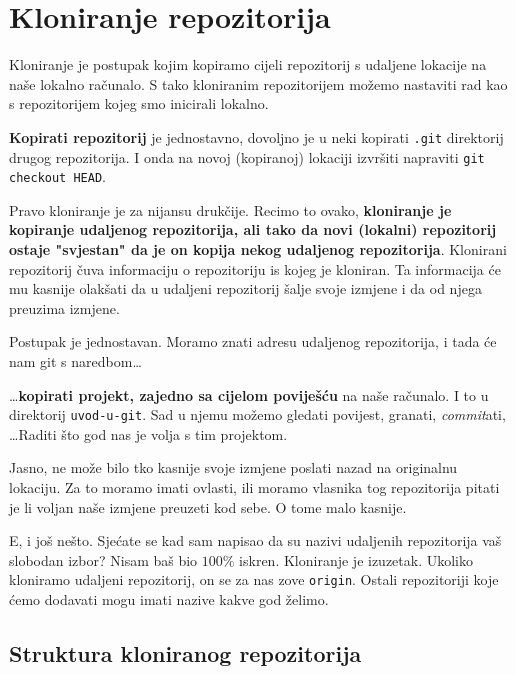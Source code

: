 \section*{Kloniranje repozitorija}

Kloniranje je postupak kojim kopiramo cijeli repozitorij s udaljene lokacije na naše lokalno računalo.
S tako kloniranim repozitorijem možemo nastaviti rad kao s repozitorijem kojeg smo inicirali lokalno.

\textbf{Kopirati repozitorij} je jednostavno, dovoljno je u neki kopirati \verb+.git+ direktorij drugog repozitorija.
I onda na novoj (kopiranoj) lokaciji izvršiti napraviti \verb+git checkout HEAD+.

Pravo kloniranje je za nijansu drukčije.
Recimo to ovako, \textbf{kloniranje je kopiranje udaljenog repozitorija, ali tako da novi (lokalni) repozitorij ostaje "svjestan" da je on kopija nekog udaljenog repozitorija}.
Klonirani repozitorij čuva informaciju o repozitoriju is kojeg je kloniran.
Ta informacija će mu kasnije olakšati da u udaljeni repozitorij šalje svoje izmjene i da od njega preuzima izmjene.

Postupak je jednostavan. Moramo znati adresu udaljenog repozitorija, i tada će nam git s naredbom\dots



\dots{}\textbf{kopirati projekt, zajedno sa cijelom poviješću} na naše računalo.
I to u direktorij \verb+uvod-u-git+.
Sad u njemu možemo gledati povijest, granati, \emph{commit}ati, \dots Raditi što god nas je volja s tim projektom.

Jasno, ne može bilo tko kasnije svoje izmjene poslati nazad na originalnu lokaciju. 
Za to moramo imati ovlasti, ili moramo vlasnika tog repozitorija pitati je li voljan naše izmjene preuzeti kod sebe.
O tome malo kasnije.

E, i još nešto. Sjećate se kad sam napisao da su nazivi udaljenih repozitorija vaš slobodan izbor?
Nisam baš bio $100\%$ iskren. 
Kloniranje je izuzetak.
Ukoliko kloniramo udaljeni repozitorij, on se za nas zove \verb+origin+.
Ostali repozitoriji koje ćemo dodavati mogu imati nazive kakve god želimo.

\subsection*{Struktura kloniranog repozitorija}

